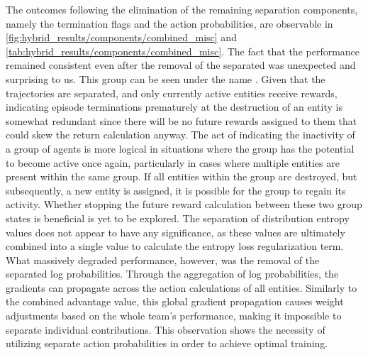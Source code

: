 \noindent The outcomes following the elimination of the remaining separation components, namely the termination flags and the action probabilities, are observable in \autoref{fig:hybrid_results/components/combined_misc} and \autoref{tab:hybrid_results/components/combined_misc}. The fact that the performance remained consistent even after the removal of the separated  was unexpected and surprising to us. This group can be seen under the name . Given that the trajectories are separated, and only currently active entities receive rewards, indicating episode terminations prematurely at the destruction of an entity is somewhat redundant since there will be no future rewards assigned to them that could skew the return calculation anyway. The act of indicating the inactivity of a group of agents is more logical in situations where the group has the potential to become active once again, particularly in cases where multiple entities are present within the same group. If all entities within the group are destroyed, but subsequently, a new entity is assigned, it is possible for the group to regain its activity. Whether stopping the future reward calculation between these two group states is beneficial is yet to be explored. The separation of distribution entropy values does not appear to have any significance, as these values are ultimately combined into a single value to calculate the entropy loss regularization term. What massively degraded performance, however, was the removal of the separated log probabilities. Through the aggregation of log probabilities, the gradients can propagate across the action calculations of all entities. Similarly to the combined advantage value, this global gradient propagation causes weight adjustments based on the whole team's performance, making it impossible to separate individual contributions. This observation shows the necessity of utilizing separate action probabilities in order to achieve optimal training.

